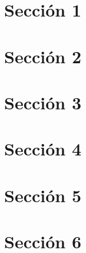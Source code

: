 \documentclass[11pt]{article}
\begin{document}
\newpage
\newpage
\pagestyle{empty}
\renewcommand{\contentsname}{{\textit{\huge Índice}}} %
\tableofcontents

\newpage
\pagestyle{empty}
\renewcommand{\listfigurename}{{\textit{\huge Lista de figuras}}}
\listoffigures

\newpage
\pagestyle{fancy} %
\setcounter{page}{1} %
\seteocontadores
\section{Sección 1}
\label{sec:seccion1}


\newpage
\seteocontadores
\section{Sección 2}
\label{sec:seccion2}


\newpage
\seteocontadores
\section{Sección 3}
\label{sec:seccion3}


\newpage
\seteocontadores
\section{Sección 4}
\label{sec:seccion4}


\newpage
\seteocontadores
\section{Sección 5}
\label{sec:seccion5}


\newpage
\seteocontadores
\section{Sección 6}
\label{sec:seccion6}



\appendix %
\clearpage
\newpage
{} %
\def \nombreapendice{A} %
\formatoapendice %
\seteocontadores %
\end{document}
